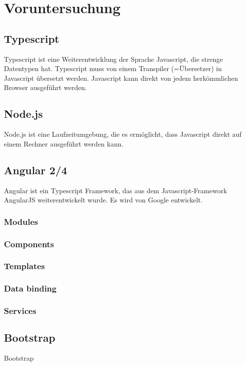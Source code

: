 \section{Voruntersuchung}

\subsection{Typescript}
Typescript ist eine Weiterentwicklung der Sprache Javascript, die strenge Datentypen hat. Typescript muss von einem Transpiler (=Übersetzer) in Javascript übersetzt werden. Javascript kann direkt von jedem herkömmlichen Browser ausgeführt werden.

\subsection{Node.js}
Node.js ist eine Laufzeitumgebung, die es ermöglicht, dass Javascript direkt auf einem Rechner ausgeführt werden kann. 

\subsection{Angular 2/4}
Angular ist ein Typescript Framework, das aus dem Javascript-Framework AngularJS weiterentwickelt wurde. Es wird von Google entwickelt.

\subsubsection{Modules}

\subsubsection{Components}

\subsubsection{Templates}

\subsubsection{Data binding}

\subsubsection{Services}

\subsection{Bootstrap}
Bootstrap 


